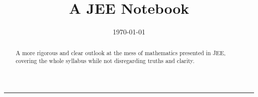 \documentclass[twoside,a4paper,10pt,strict]{memoir}
\date{\today}
\title{A JEE Notebook}
\begin{document}

\begin{titlingpage}
    \BgThispage
    \vspace*{0.4\textheight}
    \noindent
    \textcolor{white}{\Huge\textbf{\textsf{\thetitle}}}
    \vspace*{2cm}\par
    \noindent
    \begin{minipage}{0.35\linewidth}
        \begin{flushright}
            \printauthor
        \end{flushright}
    \end{minipage} \hspace{15pt}
    \begin{minipage}{0.02\linewidth}
        \rule{1pt}{175pt}
    \end{minipage} \hspace{-10pt}
    \begin{minipage}{0.63\linewidth}
    \vspace{5pt}
        \begin{abstract} 
    A more rigorous and clear outlook at the mess of mathematics presented in JEE, covering the whole syllabus while not disregarding truths and clarity.
        \end{abstract}
    \end{minipage}
\end{titlingpage}
    \restoregeometry

\frontmatter    
    \renewcommand*{\contentsname}{Short contents}
    \setcounter{tocdepth}{0}%
    \tableofcontents
    \clearpage
    \renewcommand*{\contentsname}{Contents}
    \setcounter{tocdepth}{1}%
    \tableofcontents
    
    \clearpage
    \listoffigures
    \restoregeometry
    \pagestyle{mystyle}
    
    
    \mainmatter
    
    
    


    

    \begin{appendices}
                    
    \end{appendices}
    
    \backmatter
    \printindex
\end{document}
